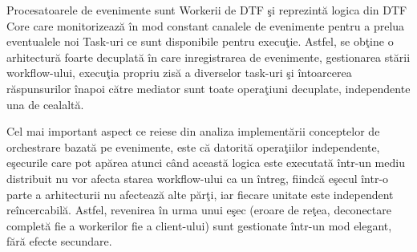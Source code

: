 \par Procesatoarele de evenimente sunt Workerii de DTF şi reprezintă logica din DTF Core care monitorizează în mod constant canalele de evenimente pentru a prelua eventualele noi Task-uri ce sunt disponibile pentru execuţie. Astfel, se obţine o arhitectură foarte decuplată în care inregistrarea de evenimente, gestionarea stării workflow-ului, execuţia propriu zisă a diverselor task-uri şi întoarcerea răspunsurilor înapoi către mediator sunt toate operaţiuni decuplate, independente una de cealaltă.
\par Cel mai important aspect ce reiese din analiza implementării conceptelor de orchestrare bazată pe evenimente, este că datorită operaţiilor independente, eşecurile care pot apărea atunci când această logica este executată într-un mediu distribuit nu vor afecta starea workflow-ului ca un întreg, fiindcă eşecul într-o parte a arhitecturii nu afectează alte părţi, iar fiecare unitate este independent reîncercabilă. Astfel, revenirea în urma unui eşec (eroare de reţea, deconectare completă fie a workerilor fie a client-ului) sunt gestionate într-un mod elegant, fără efecte secundare. 

